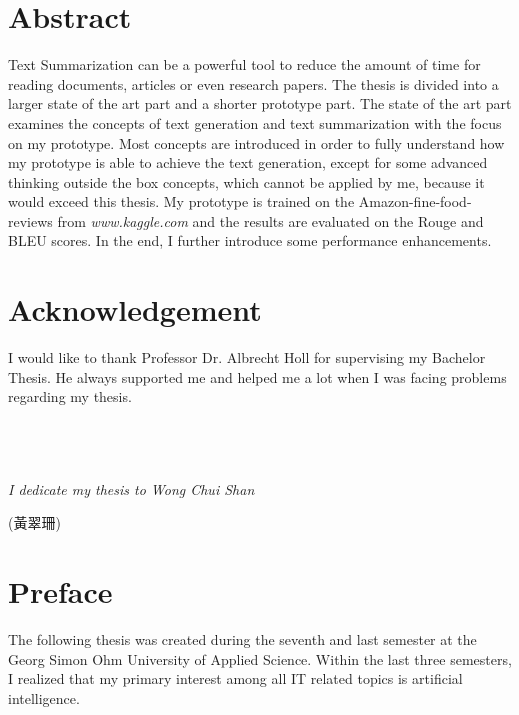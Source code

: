 \thispagestyle{empty}

\section*{Abstract}
\label{sec:abstract}

Text Summarization can be a powerful tool to reduce the amount of time for reading documents, articles or even research papers. The thesis is divided into a larger state of the art part and a shorter prototype part. The state of the art part examines the concepts of text generation and text summarization with the focus on my prototype. Most concepts are introduced in order to fully understand how my prototype is able to achieve the text generation, except for some advanced thinking outside the box concepts, which cannot be applied by me, because it would exceed this thesis. My prototype is trained on the Amazon-fine-food-reviews from \textit{www.kaggle.com} and the results are evaluated on the Rouge and BLEU scores. In the end, I further introduce some performance enhancements. 

\null\newpage

\section*{Acknowledgement}

I would like to thank Professor Dr. Albrecht Holl for supervising my Bachelor Thesis. He always supported me and helped me a lot when I was facing problems regarding my thesis. \\ \\ \\ \\

\begin{center}
\LARGE{\textit{I dedicate my thesis to Wong Chui Shan} 
\begin{CJK*}{UTF8}{bsmi} 
	(黃翠珊)
\end{CJK*}
}
\end{center}
\null\newpage

\section*{Preface}
\label{sec:prolog_1}

The following thesis was created during the seventh and last semester at the Georg Simon Ohm University of Applied Science. 
Within the last three semesters, I realized that my primary interest among all IT related topics is artificial intelligence.

